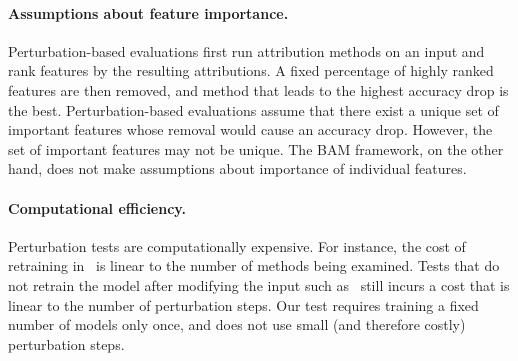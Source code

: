 \documentclass[twoside]{article}
\newcommand{\MCS}{\textit{MCS}}
\begin{document}
\paragraph{Assumptions about feature importance.}Perturbation-based evaluations first run attribution methods on an input and rank features by the resulting attributions. A fixed percentage of highly ranked features are then removed, and method that leads to the highest accuracy drop is the best. Perturbation-based evaluations assume that there exist a unique set of important features whose removal would cause an accuracy drop. However, the set of important features may not be unique. The BAM framework, on the other hand, does not make assumptions about importance of individual features.



\paragraph{Computational efficiency.} Perturbation tests are computationally expensive. For instance, the cost of retraining in~\citet{Hooker18} is linear to the number of methods being examined. Tests that do not retrain the model after modifying the input such as~\citet{Fong17, Ancona18, Hooker18} still incurs a cost that is linear to the number of perturbation steps. Our test requires training a fixed number of models only once, and does not use small (and therefore costly) perturbation steps.


\end{document}
